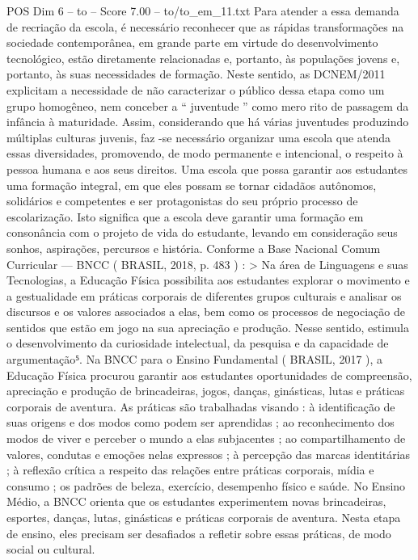 \begin{textsample}{POS Dim 6 – to – Score 7.00 – to/to\_em\_11.txt}
Para atender a essa demanda de recriação da escola, é necessário reconhecer que as rápidas transformações na sociedade contemporânea, em grande parte em virtude do desenvolvimento tecnológico, estão diretamente relacionadas e, portanto, às populações jovens e, portanto, às suas necessidades de formação.
Neste sentido, as DCNEM/2011 explicitam a necessidade de não caracterizar o público dessa etapa como um grupo homogêneo, nem conceber a “ juventude ” como mero rito de passagem da infância à maturidade.
Assim, considerando que há várias juventudes produzindo múltiplas culturas juvenis, faz -se necessário organizar uma escola que atenda essas diversidades, promovendo, de modo permanente e intencional, o respeito à pessoa humana e aos seus direitos.
Uma escola que possa garantir aos estudantes uma formação integral, em que eles possam se tornar cidadãos autônomos, solidários e competentes e ser protagonistas do seu próprio processo de escolarização.
Isto significa que a escola deve garantir uma formação em consonância com o projeto de vida do estudante, levando em consideração seus sonhos, aspirações, percursos e história.
Conforme a Base Nacional Comum Curricular — BNCC ( BRASIL, 2018, p. 483 ) : > Na área de Linguagens e suas Tecnologias, a Educação Física possibilita aos estudantes explorar o movimento e a gestualidade em práticas corporais de diferentes grupos culturais e analisar os discursos e os valores associados a elas, bem como os processos de negociação de sentidos que estão em jogo na sua apreciação e produção.
Nesse sentido, estimula o desenvolvimento da curiosidade intelectual, da pesquisa e da capacidade de argumentação⁵.
Na BNCC para o Ensino Fundamental ( BRASIL, 2017 ), a Educação Física procurou garantir aos estudantes oportunidades de compreensão, apreciação e produção de brincadeiras, jogos, danças, ginásticas, lutas e práticas corporais de aventura.
As práticas são trabalhadas visando : à identificação de suas origens e dos modos como podem ser aprendidas ; ao reconhecimento dos modos de viver e perceber o mundo a elas subjacentes ; ao compartilhamento de valores, condutas e emoções nelas expressos ; à percepção das marcas identitárias ; à reflexão crítica a respeito das relações entre práticas corporais, mídia e consumo ; os padrões de beleza, exercício, desempenho físico e saúde.
No Ensino Médio, a BNCC orienta que os estudantes experimentem novas brincadeiras, esportes, danças, lutas, ginásticas e práticas corporais de aventura.
Nesta etapa de ensino, eles precisam ser desafiados a refletir sobre essas práticas, de modo social ou cultural.

\end{textsample}
